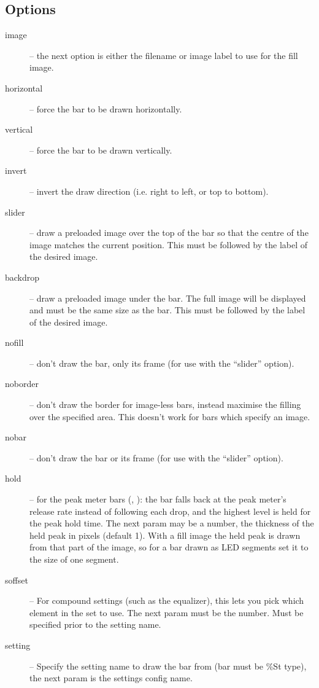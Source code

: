 \subsection{Options}
\begin{description}
  \item[image] -- the next option is either the filename or image label to
    use for the fill image.
  \item[horizontal] -- force the bar to be drawn horizontally.
  \item[vertical] -- force the bar to be drawn vertically.
  \item[invert] -- invert the draw direction (i.e. right to left, or top to
    bottom).
  \item[slider] -- draw a preloaded image over the top of the bar so that
    the centre of the image matches the current position. This must be
    followed by the label of the desired image.
  \item[backdrop] -- draw a preloaded image under the bar. The full
    image will be displayed and must be the same size as the bar.
    This must be followed by the label of the desired image.
  \item[nofill] -- don't draw the bar, only its frame (for use with the
     ``slider'' option).
  \item[noborder] -- don't draw the border for image-less bars, instead maximise
    the filling over the specified area. This doesn't work for bars which
    specify an image.
  \item[nobar] -- don't draw the bar or its frame (for use with the
    ``slider'' option).
  \item[hold] -- for the peak meter bars (, ):
    the bar falls back at the peak meter's release rate instead of
    following each drop, and the highest level is held for the peak hold
    time. The next param may be a number, the thickness of the held peak in
    pixels (default 1). With a fill image the held peak is drawn from that
    part of the image, so for a bar drawn as LED segments set it to the size
    of one segment.
  \item[soffset] -- For compound settings (such as the equalizer), this lets you pick which element in the set to use. The next param must be the number.  Must be specified prior to the setting name.
  \item[setting] -- Specify the setting name to draw the bar from (bar must be
    \%St type), the next param is the settings config name.
\end{description}

